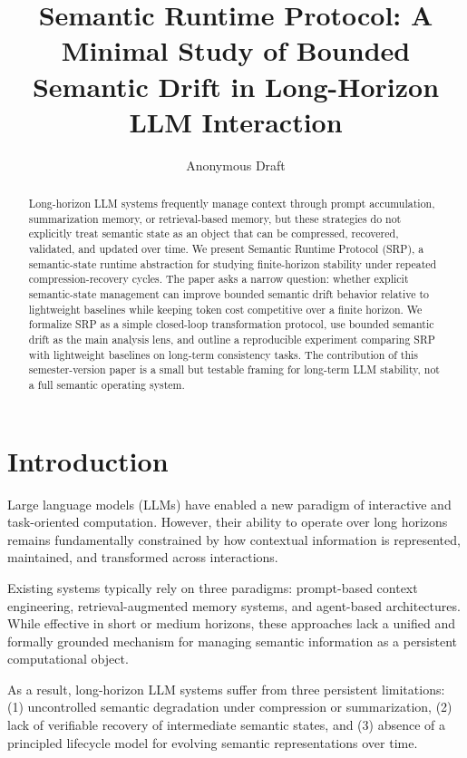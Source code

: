 \documentclass[11pt]{article}
\title{Semantic Runtime Protocol: A Minimal Study of Bounded Semantic Drift in Long-Horizon LLM Interaction}
\author{Anonymous Draft}
\date{}
\begin{document}
\maketitle

\begin{abstract}
Long-horizon LLM systems frequently manage context through prompt accumulation, summarization memory, or retrieval-based memory, but these strategies do not explicitly treat semantic state as an object that can be compressed, recovered, validated, and updated over time. We present Semantic Runtime Protocol (SRP), a semantic-state runtime abstraction for studying finite-horizon stability under repeated compression-recovery cycles. The paper asks a narrow question: whether explicit semantic-state management can improve bounded semantic drift behavior relative to lightweight baselines while keeping token cost competitive over a finite horizon. We formalize SRP as a simple closed-loop transformation protocol, use bounded semantic drift as the main analysis lens, and outline a reproducible experiment comparing SRP with lightweight baselines on long-term consistency tasks. The contribution of this semester-version paper is a small but testable framing for long-term LLM stability, not a full semantic operating system.
\end{abstract}

\section{Introduction}
Large language models (LLMs) have enabled a new paradigm of interactive and task-oriented computation. However, their ability to operate over long horizons remains fundamentally constrained by how contextual information is represented, maintained, and transformed across interactions.

Existing systems typically rely on three paradigms: prompt-based context engineering, retrieval-augmented memory systems, and agent-based architectures. While effective in short or medium horizons, these approaches lack a unified and formally grounded mechanism for managing semantic information as a persistent computational object.

As a result, long-horizon LLM systems suffer from three persistent limitations: (1) uncontrolled semantic degradation under compression or summarization, (2) lack of verifiable recovery of intermediate semantic states, and (3) absence of a principled lifecycle model for evolving semantic representations over time.
\end{document}
